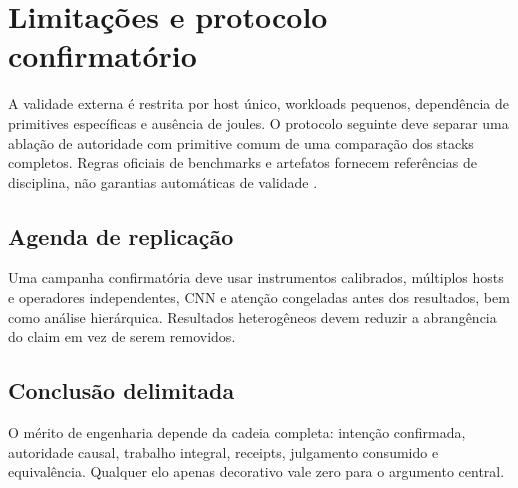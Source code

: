 \chapter{Limitações e protocolo confirmatório}
\label{chap:limites}

A validade externa é restrita por host único, workloads pequenos, dependência de
primitives específicas e ausência de joules. O protocolo seguinte deve separar
uma ablação de autoridade com primitive comum de uma comparação dos stacks
completos. Regras oficiais de benchmarks e artefatos fornecem referências de
disciplina, não garantias automáticas de validade
\parencite{specpowerdevices,mlcommonstraining,acmreproducibility}.

\section{Agenda de replicação}

Uma campanha confirmatória deve usar instrumentos calibrados, múltiplos hosts e
operadores independentes, CNN e atenção congeladas antes dos resultados, bem
como análise hierárquica. Resultados heterogêneos devem reduzir a abrangência do
claim em vez de serem removidos.

\section{Conclusão delimitada}

O mérito de engenharia depende da cadeia completa: intenção confirmada,
autoridade causal, trabalho integral, receipts, julgamento consumido e
equivalência. Qualquer elo apenas decorativo vale zero para o argumento central.

